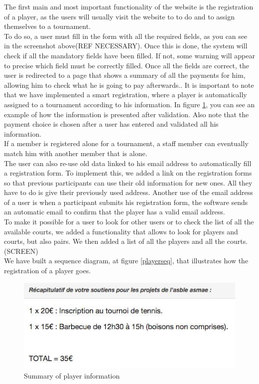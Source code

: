 \documentclass[a4paper, 12pt]{article}
\begin{document}
The first main and most important functionality of the website is the registration of a player, as the users will usually visit the website to to do and to assign themselves to a tournament.\\

To do so, a user must fill in the form with all the required fields, as you can see in the screenshot above(REF NECESSARY). Once this is done, the system will check if all the mandatory fields have been filled. If not, some warning will appear to precise which field must be correctly filled. Once all the fields are correct, the user is redirected to a page that shows a summary of all the payments for him, allowing him to check what he is going to pay afterwards.. It is important to note that we have implemented a smart registration, where a player is automatically assigned to a tournament according to his information. In figure \ref{recap}, you can see an example of how the information is presented after validation. Also note that the payment choice is chosen after a user has entered and validated all his information.\\

If a member is registered alone for a tournament, a staff member can eventually match him with another member that is alone.\\

The user can also re-use old data linked to his email address to automatically fill a registration form. To implement this, we added a link on the registration forms so that previous participants can use their old information for new ones. All they have to do is give  their previously used address. Another use of the email address of a user is when a participant submits his registration form, the software sends an automatic email to confirm that the player has a valid email address.\\

To make it possible for a user to look for other users or to check the list of all the available courts, we added a functionality that allows to look for players and courts, but also pairs. We then added a list of all the players and all the courts.(SCREEN)\\

We have built a sequence diagram, at figure \ref{playerseq}, that illustrates how the registration of a player goes.\\
\begin{figure}[h]
  \caption{\label{recap} Summary of player information}
  \includegraphics[scale=0.7]{recap.png}
\end{figure}
\end{document}
